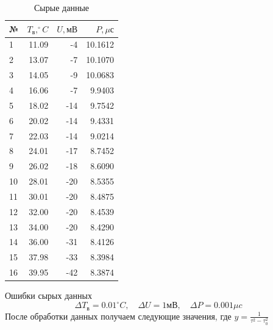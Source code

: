 \documentclass{article}
\begin{document}
\begin{table}[!h]
\begin{center}
\begin{tabular}{|l|r|r|r|}
\hline
 № & $T_{в}, ^\circ C$ & $U, мВ$ & $P, \mu с$\\ \hline
 1 & 11.09 &  -4 & 10.1612 \\
 2 & 13.07 &  -7 & 10.1070 \\
 3 & 14.05 &  -9 & 10.0683 \\
 4 & 16.06 &  -7 &  9.9403 \\\hline
 5 & 18.02 & -14 &  9.7542 \\
 6 & 20.02 & -14 &  9.4331 \\
 7 & 22.03 & -14 &  9.0214 \\
 8 & 24.01 & -17 &  8.7452 \\\hline
 9 & 26.02 & -18 &  8.6090 \\
10 & 28.01 & -20 &  8.5355 \\
11 & 30.01 & -20 &  8.4875 \\
12 & 32.00 & -20 &  8.4539 \\\hline
13 & 34.00 & -20 &  8.4290 \\
14 & 36.00 & -31 &  8.4126 \\
15 & 37.98 & -33 &  8.3984 \\
16 & 39.95 & -42 &  8.3874 \\\hline
\end{tabular}
\end{center}
\caption{Сырые данные}
\label{raw_data}
\end{table}

Ошибки сырых данных
\begin{equation*}
    \Delta T_{в} = 0.01 ^\circ C \mathrm{,}\quad
    \Delta U = 1мВ \mathrm{,}\quad\Delta
    P = 0.001 \mu c
\end{equation*}
После обработки данных получаем следующие значения, где $y=\frac{1}{\tau^2-\tau^2_0}$

\newpage
\end{document}
